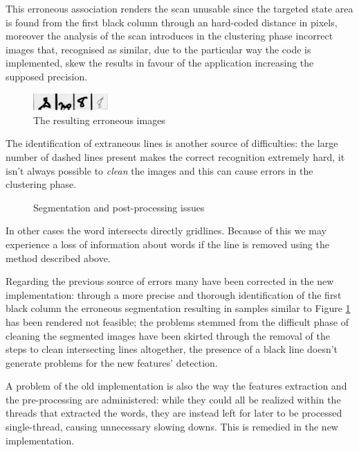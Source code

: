 This erroneous association renders the scan unusable since the targeted state area is found from the first black column through an hard-coded distance in pixels, moreover the analysis of the scan introduces in the clustering phase incorrect images that, recognised as similar, due to the particular way the code is implemented, skew the results in favour of the application increasing the supposed precision. 

\begin{figure}[!htpb]
\centering
\includegraphics[width=0.26\textwidth]{images/wrongColumn.jpg}
\caption{The resulting erroneous images}
\label{err}
\end{figure} 

The identification of extraneous lines is another source of difficulties: the large number of dashed lines present makes the correct recognition extremely hard, it isn't always possible to \emph{clean} the images and this can cause errors in the clustering phase.

\begin{figure}[!htpb]
 \centering
 \hspace{5mm}
 \caption{Segmentation and post-processing issues}
 \label{postProcessing}
 \end{figure}
\hspace{1mm}
In other cases the word intersects directly gridlines. Because of this we may experience a loss of information about words if the line is removed using the method described above.



Regarding the previous source of errors many have been corrected in the new implementation:
through a more precise and thorough identification of the first black column the erroneous segmentation resulting in samples similar to Figure \ref{err} has been rendered not feasible; the problems stemmed from the difficult phase of cleaning the segmented images have been skirted through the removal of the steps to clean intersecting lines altogether, the presence of a black line doesn't generate problems for the new features' detection.

A problem of the old implementation is also the way the features extraction and the pre-processing are administered: while they could all be realized within the threads that extracted the words, they are instead left for later to be processed single-thread, causing unnecessary slowing downs. This is remedied in the new implementation. 